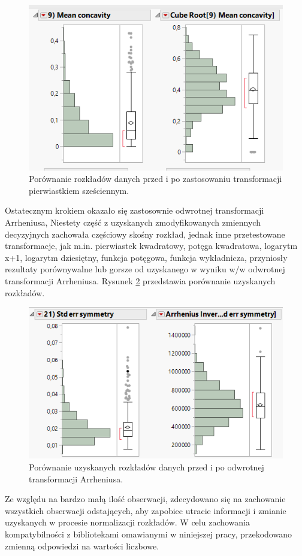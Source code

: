 \begin{figure}[!ht]
	\centering
	\includegraphics[width=0.7\linewidth]{Rysunki/Rozdzial3/cube_root}
	\caption{Porównanie rozkładów danych przed i po zastosowaniu transformacji pierwiastkiem sześciennym.}
	\label{fig:cuberoot}
\end{figure}

	Ostatecznym krokiem okazało się zastosownie odwrotnej transformacji Arrheniusa, Niestety część z uzyskanych zmodyfikowanych zmiennych decyzyjnych zachowała częściowy skośny rozkład, jednak inne przetestowane transformacje, jak m.in. pierwiastek kwadratowy, potęga kwadratowa, logarytm x+1, logarytm dziesiętny, funkcja potęgowa, funkcja wykładnicza, przyniosły rezultaty porównywalne lub gorsze od uzyskanego w wyniku w/w odwrotnej transformacji Arrheniusa. Rysunek \ref{fig:arrhenius} przedstawia porównanie uzyskanych rozkładów.
	
	\begin{figure}[!ht]
		\centering
		\includegraphics[width=0.7\linewidth]{Rysunki/Rozdzial3/arrhenius}
		\caption{Porównanie uzyskanych rozkładów danych przed i po odwrotnej transformacji Arrheniusa.}
		\label{fig:arrhenius}
	\end{figure}
	
	Ze względu na bardzo małą ilość obserwacji, zdecydowano się na zachowanie wszystkich obserwacji odstających, aby zapobiec utracie informacji i zmianie uzyskanych w procesie normalizacji rozkładów. W celu zachowania kompatybilności z bibliotekami omawianymi w niniejszej pracy, przekodowano zmienną odpowiedzi na wartości liczbowe.

